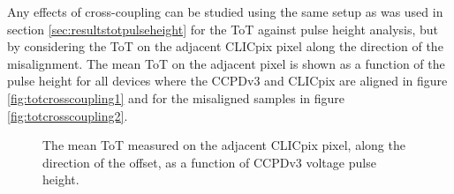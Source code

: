 Any effects of cross-coupling can be studied using the same setup as was used in section \ref{sec:resultstotpulseheight} for the ToT against pulse height analysis, but by considering the ToT on the adjacent CLICpix pixel along the direction of the misalignment.  The mean ToT on the adjacent pixel is shown as a function of the pulse height for all devices where the CCPDv3 and CLICpix are aligned in figure \ref{fig:totcrosscoupling1} and for the misaligned samples in figure \ref{fig:totcrosscoupling2}.

\begin{figure}[h!]
\centering
{}\hfill
{}
\label{fig:totcrosscoupling}
\caption[The mean ToT measured on the adjacent CLICpix pixel, along the direction of the offset, as a function of CCPDv3 voltage pulse height.]{The mean ToT measured on the adjacent CLICpix pixel, along the direction of the offset, as a function of CCPDv3 voltage pulse height.}
\end{figure}

